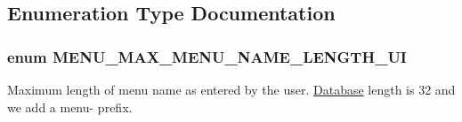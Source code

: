 \subsection{Enumeration Type Documentation}
\hypertarget{menu_8module_a3f5ac95d690e01db43fce5260fab1705}{
\subsubsection[{MENU\_\-MAX\_\-MENU\_\-NAME\_\-LENGTH\_\-UI}]{\setlength{\rightskip}{0pt plus 5cm}enum {\bf MENU\_\-MAX\_\-MENU\_\-NAME\_\-LENGTH\_\-UI}}}
\label{menu_8module_a3f5ac95d690e01db43fce5260fab1705}
Maximum length of menu name as entered by the user. \hyperlink{classDatabase}{Database} length is 32 and we add a menu-\/ prefix. 

